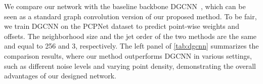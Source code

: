 \documentclass[runningheads]{llncs}
\begin{document}
 We compare our network with the baseline backbone DGCNN~\cite{wang2019dynamic}, which can be seen as a standard graph convolution version of our proposed method. To be fair, we train DGCNN on the PCPNet dataset to predict point-wise weights and offsets. The neighborhood size and the jet order of the two methods are the same and equal to 256 and 3, respectively. The left panel of \cref{tab:dgcnn} summarizes the comparison results, where our method outperforms DGCNN in various settings, such as different noise levels and varying point density, demonstrating the overall advantages of our designed network. 


\begin{table}[t]
\begin{center}
\caption{RMSE comparison with different Jet order $n$ on the PCPNet dataset.}
\end{center}
\end{table}
\end{document}
